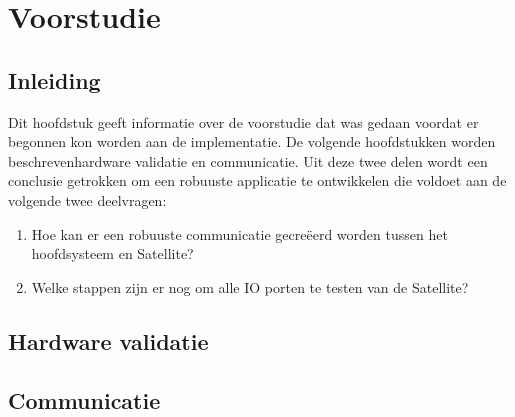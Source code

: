 \chapter{Voorstudie}
\section{Inleiding}
Dit hoofdstuk geeft informatie over de voorstudie dat was gedaan voordat er begonnen kon worden aan de implementatie. De volgende hoofdstukken worden beschrevenhardware validatie en communicatie. Uit deze twee delen wordt een conclusie getrokken om een robuuste applicatie te ontwikkelen die voldoet aan de volgende twee deelvragen:
\begin{enumerate}
	\item Hoe kan er een robuuste  communicatie gecreëerd worden tussen het hoofdsysteem en Satellite?
	\item Welke stappen zijn er nog om alle IO porten te testen van de Satellite?
\end{enumerate}

\section{Hardware validatie}


\newpage
\section{Communicatie}
